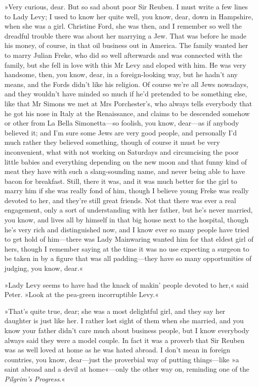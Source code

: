 »Very curious, dear. But so sad about poor Sir Reuben. I must write a few lines to Lady Levy; I used to know her quite well, you know, dear, down in Hampshire, when she was a girl. Christine Ford, she was then, and I remember so well the dreadful trouble there was about her marrying a Jew. That was before he made his money, of course, in that oil business out in America. The family wanted her to marry Julian Freke, who did so well afterwards and was connected with the family, but she fell in love with this Mr Levy and eloped with him. He was very handsome, then, you know, dear, in a foreign-looking way, but he hadn't any means, and the Fords didn't like his religion. Of course we're all Jews nowadays, and they wouldn't have minded so much if he'd pretended to be something else, like that Mr Simons we met at Mrs Porchester's, who always tells everybody that he got his nose in Italy at the Renaissance, and claims to be descended somehow or other from La Bella Simonetta—so foolish, you know, dear—as if anybody believed it; and I'm sure some Jews are very good people, and personally I'd much rather they believed something, though of course it must be very inconvenient, what with not working on Saturdays and circumcising the poor little babies and everything depending on the new moon and that funny kind of meat they have with such a slang-sounding name, and never being able to have bacon for breakfast. Still, there it was, and it was much better for the girl to marry him if she was really fond of him, though I believe young Freke was really devoted to her, and they're still great friends. Not that there was ever a real engagement, only a sort of understanding with her father, but he's never married, you know, and lives all by himself in that big house next to the hospital, though he's very rich and distinguished now, and I know ever so many people have tried to get hold of him—there was Lady Mainwaring wanted him for that eldest girl of hers, though I remember saying at the time it was no use expecting a surgeon to be taken in by a figure that was all padding—they have so many opportunities of judging, you know, dear.«

»Lady Levy seems to have had the knack of makin' people devoted to her,« said Peter. »Look at the pea-green incorruptible Levy.«

»That's quite true, dear; she was a most delightful girl, and they say her daughter is just like her. I rather lost sight of them when she married, and you know your father didn't care much about business people, but I know everybody always said they were a model couple. In fact it was a proverb that Sir Reuben was as well loved at home as he was hated abroad. I don't mean in foreign countries, you know, dear—just the proverbial way of putting things—like »a saint abroad and a devil at home«---only the other way on, reminding one of the \textit{Pilgrim's Progress}.«

